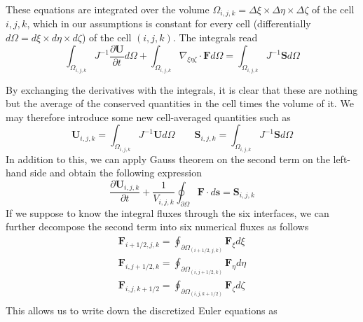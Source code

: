 These equations are integrated over the volume $\Omega_{i, j, k} = \Delta \xi \times \Delta \eta \times \Delta \zeta $ of the cell $i, j, k$, which in our assumptions is constant for every cell (differentially $d \Omega = d \xi \times d \eta \times d \zeta$) of the cell $(i, j, k)$. The integrals read
\begin{equation}
	\int_{\Omega_{i, j, k}} J^{-1} \frac{\partial \mathbf{U}}{\partial t} d \Omega + \int_{\Omega_{i, j, k}} \nabla_{\xi \eta \zeta} \cdot \mathbf{F} d\Omega = \int_{\Omega_{i, j, k}} J^{-1} \mathbf{S} d \Omega
\end{equation}

By exchanging the derivatives with the integrals, it is clear that these are nothing but the average of the conserved quantities in the cell times the volume of it. We may therefore introduce some new cell-averaged quantities such as 
\begin{equation}
\mathbf{U}_{i, j, k} = \int_{\Omega_{i, j, k}} J^{-1} \mathbf{U} d \Omega \qquad \mathbf{S}_{i, j, k} = \int_{\Omega_{i, j, k}} J^{-1} \mathbf{S} d \Omega
\end{equation}
In addition to this, we can apply Gauss theorem on the second term on the left-hand side and obtain the following expression
\begin{equation}
	\frac{\partial \mathbf{U}_{i, j, k}}{\partial t} + \frac{1}{V_{i, j, k}} \oint_{\partial \Omega} \mathbf{F} \cdot d \mathbf{s} = \mathbf{S}_{i, j, k}
\end{equation}
If we suppose to know the integral fluxes through the six interfaces, we can further decompose the second term into six numerical fluxes as follows
\begin{equation}
\begin{split}
	\mathbf{F}_{i+ 1/2, j, k} = \oint_{\partial \Omega_{(i + 1/2, j, k)}} \mathbf{F}_{\xi} d \xi \\
	\mathbf{F}_{i, j + 1/2, k} = \oint_{\partial \Omega_{(i , j + 1/2, k)}} \mathbf{F}_{\eta} d \eta \\
	\mathbf{F}_{i, j, k + 1/2} = \oint_{\partial \Omega_{(i , j, k + 1/2)}} \mathbf{F}_{\zeta} d \zeta \\
\end{split}
\end{equation}
This allows us to write down the discretized Euler equations as 


